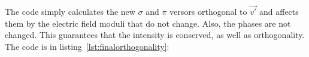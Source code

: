 \documentclass{iucr}
\begin{document}







The code simply calculates the new $\sigma$ and $\pi$ versors orthogonal to $\vec{v'}$ and affects them by the electric field moduli that do not change. 
Also, the phases are not changed. 
This guarantees that the intensity is conserved, as well as orthogonality.
The code is in listing~\ref{lst:finalorthogonality}: 
\end{document}
